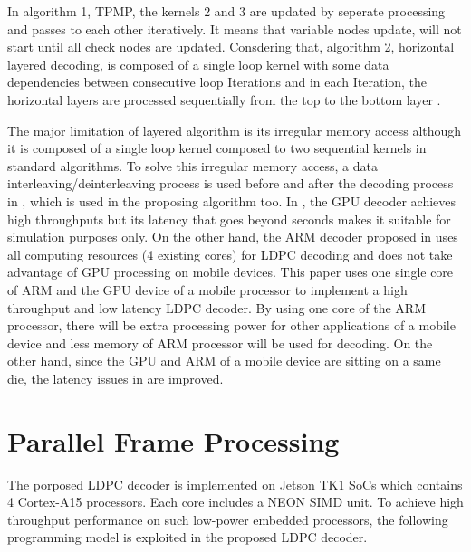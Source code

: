 \documentclass[conference]{IEEEtran}
\begin{document}
In algorithm 1, TPMP, the kernels 2 and 3 are updated by seperate processing and passes to each other iteratively. It means that variable nodes update, will not start until all check nodes are updated. Consdering that, algorithm 2, horizontal layered decoding, is composed of a single loop kernel with some data dependencies between consecutive loop Iterations and in each Iteration, the horizontal layers are processed sequentially from the top to the bottom layer \cite{art_quasi}.

The major limitation of layered algorithm is its irregular memory access although it is composed of a single loop kernel composed to two sequential kernels in standard algorithms. To solve this irregular memory access, a data interleaving/deinterleaving process is used before and after the decoding process in \cite{art_gpu_0, art_neon}, which is used in the proposing algorithm too. In \cite{art_gpu_0}, the GPU decoder achieves high throughputs but its latency that goes beyond seconds makes it suitable for simulation purposes only. On the other hand, the ARM decoder proposed in \cite{art_neon} uses all computing resources (4 existing cores) for LDPC decoding and does not take advantage of GPU processing on mobile devices. This paper uses one single core of ARM and the GPU device of a mobile processor to implement a high throughput and low latency LDPC decoder. By using one core of the ARM processor, there will be extra processing power for other applications of a mobile device and less memory of ARM processor will be used for decoding. On the other hand, since the GPU and ARM of a mobile device are sitting on a same die, the latency issues in \cite{art_gpu_0} are improved.

\section{Parallel Frame Processing} \label{sec3}
The porposed LDPC decoder is implemented on Jetson TK1 SoCs which contains 4 Cortex-A15 processors. Each core includes a NEON SIMD unit. To achieve high throughput performance on such low-power embedded processors, the following programming model is exploited in the proposed LDPC decoder.
\end{document}

